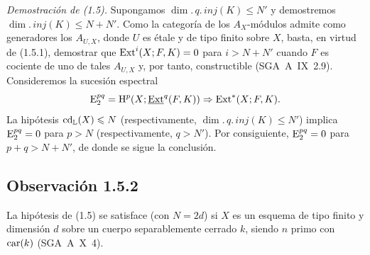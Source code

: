 \emph{Demostración de (1.5).} Supongamos $\dim.\,q.\,inj(K) \leqslant N'$ y demostremos $\dim.\,inj(K) \leqslant N + N'$. Como la categoría de los $A_X$-módulos admite como generadores los $A_{U,X}$, donde $U$ es étale y de tipo finito sobre $X$, basta, en virtud de (1.5.1), demostrar que $\operatorname{Ext}^i(X; F,K) = 0$ para $i > N + N'$ cuando $F$ es cociente de uno de tales $A_{U,X}$ y, por tanto, constructible (SGA~A~IX~2.9). Consideremos la sucesión espectral
\[
\mathrm{E}_2^{pq} = \mathrm{H}^p(X; \underline{\operatorname{Ext}}^q(F,K)) \Rightarrow \operatorname{Ext}^{*}(X; F,K).
\]
La hipótesis $\operatorname{cd}_{\mathbb{L}}(X) \leqslant N$ (respectivamente, $\dim.\,q.\,inj(K) \leqslant N'$) implica $\mathrm{E}_2^{pq} = 0$ para $p > N$ (respectivamente, $q > N'$). Por consiguiente, $\mathrm{E}_2^{pq} = 0$ para $p+q > N+N'$, de donde se sigue la conclusión.

\subsection*{Observación 1.5.2}
La hipótesis de (1.5) se satisface (con $N = 2d$) si $X$ es un esquema de tipo finito y dimensión $d$ sobre un cuerpo separablemente cerrado $k$, siendo $n$ primo con $\operatorname{car}(k)$ (SGA~A~X~4).
